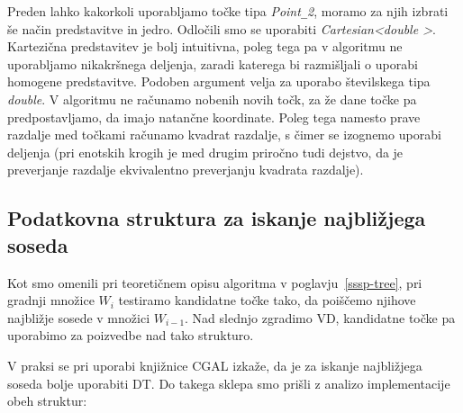 \documentclass[a4paper, 12pt]{book}
\newcommand{\U}{\texttt{\_}}
\begin{document}
Preden lahko kakorkoli uporabljamo točke tipa \textit{Point\U 2}, moramo za njih izbrati še način predstavitve in jedro. Odločili smo se uporabiti \textit{Cartesian\textless double \textgreater}. Kartezična predstavitev je bolj intuitivna, poleg tega pa v algoritmu ne uporabljamo nikakršnega deljenja, zaradi katerega bi razmišljali o uporabi homogene predstavitve. Podoben argument velja za uporabo številskega tipa \textit{double}. V algoritmu ne računamo nobenih novih točk, za že dane točke pa predpostavljamo, da imajo natančne koordinate. Poleg tega namesto prave razdalje med točkami računamo kvadrat razdalje, s čimer se izognemo uporabi deljenja (pri enotskih krogih je med drugim priročno tudi dejstvo, da je preverjanje razdalje ekvivalentno preverjanju kvadrata razdalje).

\subsection{Podatkovna struktura za iskanje najbližjega soseda}
\label{why dt}

Kot smo omenili pri teoretičnem opisu algoritma v poglavju~\ref{sssp-tree}, pri gradnji množice $W_i$ testiramo kandidatne točke tako, da poiščemo njihove najbližje sosede v množici $W_{i-1}$. Nad slednjo zgradimo VD, kandidatne točke pa uporabimo za poizvedbe nad tako strukturo.

V praksi se pri uporabi knjižnice CGAL izkaže, da je za iskanje najbližjega soseda bolje uporabiti DT. Do takega sklepa smo prišli z analizo implementacije obeh struktur:
\end{document}
